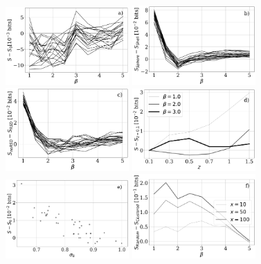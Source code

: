 \documentclass[fleqn,usenatbib]{mnras}
\begin{document}
\begin{figure}
    \centering
    \includegraphics[width=0.42\textwidth]{cosmic_variance.pdf} 
    \includegraphics[width=0.42\textwidth]{geometry.pdf} 
    \includegraphics[width=0.42\textwidth]{rsd.pdf} 
    \includegraphics[width=0.42\textwidth]{redshift.pdf} 
    \includegraphics[width=0.42\textwidth]{param.pdf}
    \includegraphics[width=0.42\textwidth]{random_clustered_n1.pdf}

\end{figure}
\end{document}
